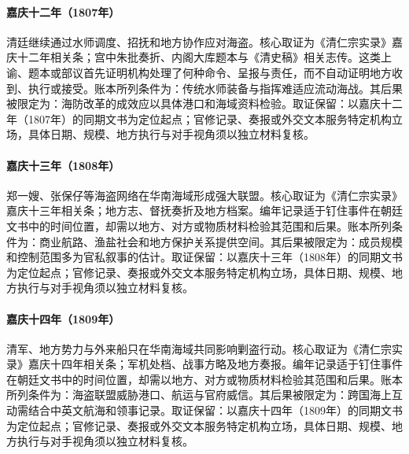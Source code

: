\hypertarget{ledger:EQ-1807-COASTAL-NAVAL-REFORM}{}\paragraph{嘉庆十二年（1807年）}清廷继续通过水师调度、招抚和地方协作应对海盗。核心取证为《清仁宗实录》嘉庆十二年相关条；宫中朱批奏折、内阁大库题本与《清史稿》相关志传。这类上谕、题本或部议首先证明机构处理了何种命令、呈报与责任，而不自动证明地方收到、执行或接受。账本所列条件为：传统水师装备与指挥难适应流动海战。其后果被限定为：海防改革的成效应以具体港口和海域资料检验。取证保留：以嘉庆十二年（1807年）的同期文书为定位起点；官修记录、奏报或外交文本服务特定机构立场，具体日期、规模、地方执行与对手视角须以独立材料复核。
\hypertarget{ledger:EQ-1808-PIRATE-ALLIANCES}{}\paragraph{嘉庆十三年（1808年）}郑一嫂、张保仔等海盗网络在华南海域形成强大联盟。核心取证为《清仁宗实录》嘉庆十三年相关条；地方志、督抚奏折及地方档案。编年记录适于钉住事件在朝廷文书中的时间位置，却需以地方、对方或物质材料检验其范围和后果。账本所列条件为：商业航路、渔盐社会和地方保护关系提供空间。其后果被限定为：成员规模和控制范围多为官私叙事的估计。取证保留：以嘉庆十三年（1808年）的同期文书为定位起点；官修记录、奏报或外交文本服务特定机构立场，具体日期、规模、地方执行与对手视角须以独立材料复核。
\hypertarget{ledger:EQ-1809-SOUTH-CHINA-SEA-CAMPAIGN}{}\paragraph{嘉庆十四年（1809年）}清军、地方势力与外来船只在华南海域共同影响剿盗行动。核心取证为《清仁宗实录》嘉庆十四年相关条；军机处档、战事方略及地方奏报。编年记录适于钉住事件在朝廷文书中的时间位置，却需以地方、对方或物质材料检验其范围和后果。账本所列条件为：海盗联盟威胁港口、航运与官府威信。其后果被限定为：跨国海上互动需结合中英文航海和领事记录。取证保留：以嘉庆十四年（1809年）的同期文书为定位起点；官修记录、奏报或外交文本服务特定机构立场，具体日期、规模、地方执行与对手视角须以独立材料复核。
